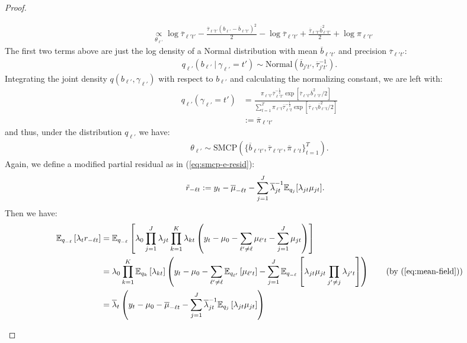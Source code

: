\begin{proof}
\begin{enumerate}[label=\roman*.]
\begin{align*}
    &\underset{\theta_{\ell'}}{\propto} \log \overline{\tau}_{\ell't'} - \frac{\overline{\tau}_{\ell't'}(b_{\ell'} - \overline{b}_{\ell't'})^2}{2} - \log \overline{\tau}_{\ell't'} + \frac{\overline{\tau}_{\ell't'}\overline{b}^2_{\ell't'}}{2}+ \log \pi_{\ell' t'}
\end{align*}
The first two terms above are just the log density of a Normal distribution with mean $\overline{b}_{\ell't'} $ and precision $\overline{\tau}_{\ell't'}$: 
\begin{align*}
    q_{\ell'}(b_{\ell'} \:|\: \gamma_{\ell'} = t') \sim \text{Normal}(\overline{b}_{j't'} , \overline{\tau}^{-1}_{j't'}).
\end{align*}
Integrating the joint density $ q(b_{\ell'}, \gamma_{\ell'})$ with respect to $b_{\ell'}$ and calculating the normalizing constant, we are left with: 
\begin{align*}
    q_{\ell'}(\gamma_{\ell'} = t') &= \frac{\pi_{\ell't'} \overline{\tau}_{\ell't'}^{-\frac{1}{2}} \exp[\overline{\tau}_{\ell't'} \overline{b}^2_{\ell't'}/2]}{\sum_{t=1}^T \pi_{\ell't} \overline{\tau}_{\ell't}^{-\frac{1}{2}} \exp[\overline{\tau}_{\ell't} \overline{b}^2_{\ell't}/2]}\\ 
    &:= \overline{\pi}_{\ell't'} 
\end{align*}
and thus, under the distribution $q_{\ell'}$ we have:
\begin{align*}
    \theta_{\ell'} \sim \text{SMCP}(\{\overline{b}_{\ell't'} , \overline{\tau}_{\ell't'}, \overline{\pi}_{\ell't}\}_{t=1}^T).
\end{align*}
Again, we define a modified partial residual as in (\ref{eq:smcp-e-resid}):
\begin{align*}
    \tilde{r}_{-\ell t} &:= y_t - \overline{\mu}_{-\ell t} - \sum_{j=1}^J \overline{\lambda}_{jt}^{-1} \mathbb{E}_{q_{j}}[\lambda_{jt}\mu_{jt}].
\end{align*}
Then we have:
\begin{align*}
    \E_{q_{-\ell}}\left[\lambda_{t}r_{-\ell t}\right] &= \E_{q_{-\ell}}\left[\lambda_0\prod_{j=1}^J\lambda_{jt}\prod_{k=1}^K\lambda_{kt} \left(y_t - \mu_0 - \sum_{\ell'\neq \ell} \mu_{\ell't} - \sum_{j=1}^J \mu_{jt}\right)\right] \\
    &= \lambda_0 \prod_{k=1}^K\E_{q_{k}}\left[\lambda_{kt}\right]\left(y_t -\mu_0 - \sum_{\ell'\neq \ell} \E_{q_{\ell'}}\left[\mu_{\ell' t}\right] - \sum_{j=1}^J \E_{q_{-\ell}}\left[\lambda_{jt}\mu_{jt}\prod_{j'\neq j} \lambda_{j't}\right]\right) \tag{by (\ref{eq:mean-field})} \\
    &= \overline{\lambda}_{t}\left(y_t - \mu_0 - \overline{\mu}_{-\ell t} -  \sum_{j=1}^J\overline{\lambda}_{jt}^{-1} \E_{q_{j}}\left[\lambda_{jt}\mu_{jt}\right]\right) \\

\end{align*}
\end{enumerate}
\end{proof}
